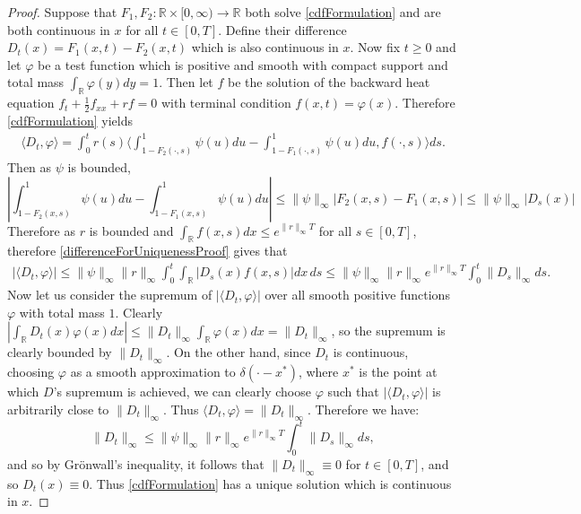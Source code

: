 \documentclass{article}
\newcommand{\B}[1]{\mathbb{#1}}
\begin{document}
\begin{proof}
    Suppose that $F_1,F_2:\B{R}\times [0,\infty)\to\B{R}$ both solve \eqref{cdfFormulation} and are both continuous in $x$ for all $t\in [0,T]$. Define their difference $D_t(x)=F_1(x,t)-F_2(x,t)$ which is also continuous in $x$. Now fix $t\geq 0$ and let $\varphi$ be a test function which is positive and smooth with compact support and total mass $\int_{\B{R}}\varphi(y)dy=1$. Then let $f$ be the solution of the backward heat equation $f_t+\frac12f_{xx}+rf=0$ with terminal condition $f(x,t)=\varphi(x)$. Therefore \eqref{cdfFormulation} yields
    \begin{align} \label{differenceForUniquenessProof}
        \langle D_t,\varphi\rangle = \int_0^t r(s)\Big\langle \int_{1-F_2(\cdot,s)}^1 \psi(u)du - \int_{1-F_1(\cdot,s)}^1 \psi(u)du, f(\cdot,s)\Big\rangle ds.
    \end{align}
    Then as $\psi$ is bounded,
    $$\left|\int_{1-F_2(x,s)}^1 \psi(u)du-\int_{1-F_1(x,s)}^1\psi(u)du\right|\leq \|\psi\|_\infty|F_2(x,s)-F_1(x,s)|\leq \|\psi\|_\infty|D_s(x)|$$
    Therefore as $r$ is bounded and $\int_{\B{R}}f(x,s)dx\leq e^{\|r\|_\infty T}$ for all $s\in [0,T]$, therefore \eqref{differenceForUniquenessProof} gives that
    \begin{align*}
        |\langle D_t, \varphi\rangle | \leq \|\psi\|_\infty \|r\|_\infty \int_0^t \int_{\B{R}} |D_s(x)f(x,s)|dx\,ds \leq \|\psi\|_\infty \|r\|_\infty e^{\|r\|_\infty T}\int_0^t \|D_s\|_\infty ds.
    \end{align*}
    Now let us consider the supremum of $|\langle D_t,\varphi\rangle|$ over all smooth positive functions $\varphi$ with total mass $1$. Clearly $|\int_{\B{R}} D_t(x)\varphi(x)dx|\leq \|D_t\|_\infty \int_{\B{R}}\varphi(x)dx=\|D_t\|_\infty$, so the supremum is clearly bounded by $\|D_t\|_\infty$. On the other hand, since $D_t$ is continuous, choosing $\varphi$ as a smooth approximation to $\delta(\cdot-x^*)$, where $x^*$ is the point at which $D$'s supremum is achieved, we can clearly choose $\varphi$ such that $|\langle D_t,\varphi\rangle|$ is arbitrarily close to $\|D_t\|_\infty$. Thus $\langle D_t,\varphi\rangle = \|D_t\|_\infty$. Therefore we have:
    $$\|D_t\|_\infty \leq \|\psi\|_\infty \|r\|_\infty e^{\|r\|_\infty T}\int_0^t \|D_s\|_\infty ds,$$
    and so by Gr\"{o}nwall's inequality, it follows that $\|D_t\|_\infty\equiv 0$ for $t\in [0,T]$, and so $D_t(x)\equiv 0$. Thus \eqref{cdfFormulation} has a unique solution which is continuous in $x$.
\end{proof}
\end{document}
